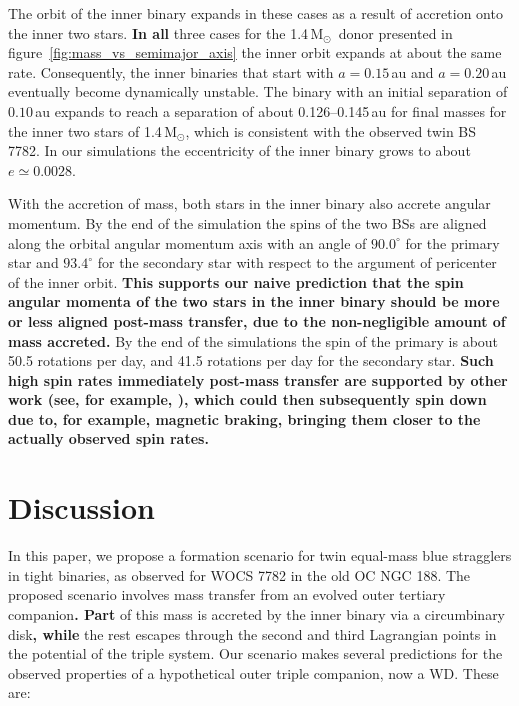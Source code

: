 \documentclass[twocolumn]{aastex62}
\newcommand{\MSun}{\mbox{M$_\odot$}}
\begin{document}
The orbit of the inner binary expands in these cases as a result of
accretion onto the inner two stars. \textbf{In all} three cases for the
1.4\,\MSun\, donor presented in
figure~\ref{fig:mass_vs_semimajor_axis} the inner orbit expands at
about the same rate. Consequently, the inner binaries that start with
$a = 0.15$\,au and $a=0.20$\,au eventually become dynamically
unstable.  The binary with an initial separation of $0.10$\,au expands
to reach a separation of about 0.126--0.145\,au for final masses for
the inner two stars of 1.4\,\MSun, which is consistent with the
observed twin BS 7782. In our simulations the eccentricity of the
inner binary grows to about $e \simeq 0.0028$.

With the accretion of mass, both stars in the inner binary also
accrete angular momentum.  By the end of the simulation the spins of
the two BSs are aligned along the orbital angular momentum axis with
an angle of $90.0^\circ$ for the primary star and $93.4^\circ$ for the
secondary star with respect to the argument of pericenter of the inner
orbit.  \textbf{This supports our naive prediction that the spin
  angular momenta of the two stars in the inner binary should be more
  or less aligned post-mass transfer, due to the non-negligible amount
  of mass accreted.} By the end of the simulations the spin of the
primary is about 50.5 rotations per day, and 41.5 rotations per day
for the secondary star.  \textbf{Such high spin rates immediately
  post-mass transfer are supported by other work (see, for example,
  \citet{2014MNRAS.438.1909D}), which could then subsequently spin
  down due to, for example, magnetic braking, bringing them closer to
  the actually observed spin rates.}

\section{Discussion} \label{sect:discussion}

In this paper, we propose a formation scenario for twin equal-mass
blue stragglers in tight binaries, as observed for WOCS 7782 in the
old OC NGC 188.  The proposed scenario involves mass transfer from an
evolved outer tertiary companion\textbf{. Part} of this mass is accreted by the
inner binary via a circumbinary disk\textbf{, while} the rest escapes through the
second and third Lagrangian points in the potential of the triple
system.  Our scenario makes several predictions for the observed
properties of a hypothetical outer triple companion, now a WD.  These
are:
\end{document}
